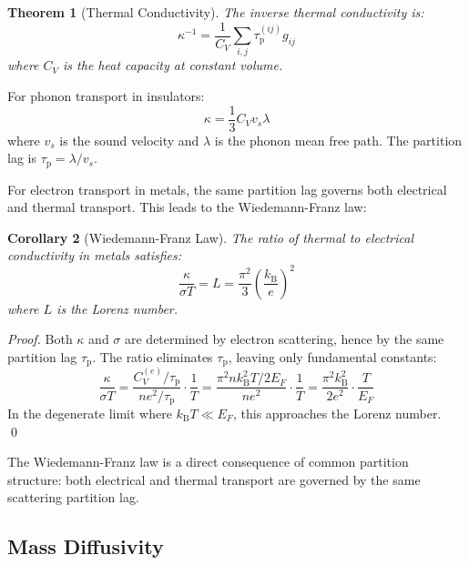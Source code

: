 \documentclass[twocolumn,10pt,aps,prd,superscriptaddress,nofootinbib]{revtex4-2}
\newtheorem{theorem}{Theorem}[section]
\newtheorem{corollary}[theorem]{Corollary}
\theoremstyle{remark}
\newcommand{\kB}{k_{\mathrm{B}}}
\newcommand{\tauP}{\tau_{\mathrm{p}}}
\newcommand{\Gij}{g_{ij}}
\begin{document}
\begin{theorem}[Thermal Conductivity]
\label{thm:thermal_conductivity}
The inverse thermal conductivity is:
\begin{equation}
\kappa^{-1} = \frac{1}{C_V} \sum_{i,j} \tauP^{(ij)} \Gij
\label{eq:thermal_conductivity}
\end{equation}
where $C_V$ is the heat capacity at constant volume.
\end{theorem}

For phonon transport in insulators:
\begin{equation}
\kappa = \frac{1}{3} C_V v_s \lambda
\label{eq:phonon_conductivity}
\end{equation}
where $v_s$ is the sound velocity and $\lambda$ is the phonon mean free path. The partition lag is $\tauP = \lambda/v_s$.

For electron transport in metals, the same partition lag governs both electrical and thermal transport. This leads to the Wiedemann-Franz law:

\begin{corollary}[Wiedemann-Franz Law]
\label{cor:wiedemann_franz}
The ratio of thermal to electrical conductivity in metals satisfies:
\begin{equation}
\frac{\kappa}{\sigma T} = L = \frac{\pi^2}{3} \left(\frac{\kB}{e}\right)^2
\label{eq:wiedemann_franz}
\end{equation}
where $L$ is the Lorenz number.
\end{corollary}

\begin{proof}
Both $\kappa$ and $\sigma$ are determined by electron scattering, hence by the same partition lag $\tauP$. The ratio eliminates $\tauP$, leaving only fundamental constants:
\begin{equation}
\frac{\kappa}{\sigma T} = \frac{C_V^{(e)}/\tauP}{ne^2/\tauP} \cdot \frac{1}{T} = \frac{\pi^2 n \kB^2 T / 2E_F}{ne^2} \cdot \frac{1}{T} = \frac{\pi^2 \kB^2}{2e^2} \cdot \frac{T}{E_F}
\end{equation}
In the degenerate limit where $\kB T \ll E_F$, this approaches the Lorenz number. \qed
\end{proof}

The Wiedemann-Franz law is a direct consequence of common partition structure: both electrical and thermal transport are governed by the same scattering partition lag.

\subsection{Mass Diffusivity}
\end{document}
